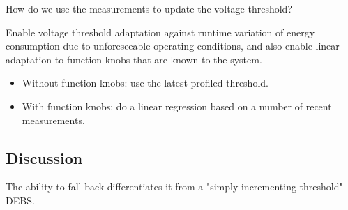 How do we use the measurements to update the voltage threshold?

Enable voltage threshold adaptation against runtime variation of energy consumption due to unforeseeable operating conditions, and also enable linear adaptation to function knobs that are known to the system. 

\begin{itemize}
    \item Without function knobs: use the latest profiled threshold.
    \item With function knobs: do a linear regression based on a number of recent measurements. 
\end{itemize}

\subsection{Discussion}

The ability to fall back differentiates it from a "simply-incrementing-threshold" DEBS.
